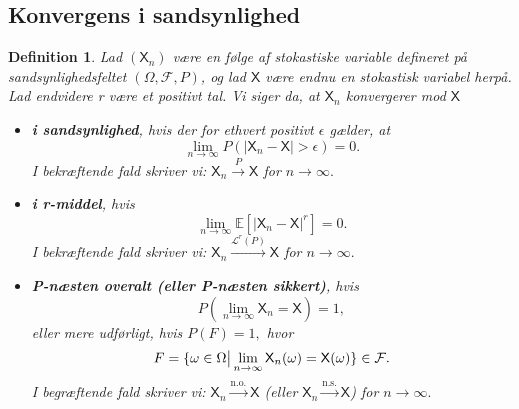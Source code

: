 \documentclass{article}
\newcommand{\E}{\mathbb{E}}
\newcommand{\1}{\mathbbm{1}}
\newcommand{\X}{\mathsf{X}}
\newcommand{\lclass}{\mathcal{L}}
\newcommand{\pfield}{(\Omega, \mathcal{F}, P)}
\newtheorem{definition}[theorem]{Definition}
\theoremstyle{boxed}
\begin{document}
\subsection{Konvergens i sandsynlighed}
\begin{theorem-box}
    \begin{definition}
        Lad $(\X_n)$ være en følge af stokastiske variable defineret på sandsynlighedsfeltet $\pfield$, og lad $\X$ være endnu en stokastisk variabel herpå. Lad endvidere r være et positivt tal. Vi siger da, at $\X_n$ konvergerer mod $\X$
        \begin{itemize}
            \item \textbf{i sandsynlighed}, hvis der for ethvert positivt $\epsilon$ gælder, at $$\lim_{n\rightarrow\infty}P(|\X_n-\X|>\epsilon)=0.$$ I bekræftende fald skriver vi: $\X_n\stackrel{P}{\longrightarrow}\X$ for $n\rightarrow \infty.$
            \item \textbf{i r-middel}, hvis $$\lim_{n\rightarrow\infty}\E\left[|\X_n-\X|^r\right]=0.$$ I bekræftende fald skriver vi: $\X_n\stackrel{\lclass^r(P)}{\longrightarrow}\X$ for $n\rightarrow \infty.$
            \item \textbf{P-næsten overalt (eller P-næsten sikkert)}, hvis $$P(\lim_{n\rightarrow\infty}\X_n=\X)=1,$$ eller mere udførligt, hvis $P(F)=1,$ hvor $$F=\{\omega\in\Omega\big{|}\lim_{n\rightarrow\infty}\X_n(\omega)=\X(\omega)\}\in \mathcal{F}.$$ I begræftende fald skriver vi: $\X_n\stackrel{\text{n.o.}}{\longrightarrow}\X$ (eller $\X_n\stackrel{\text{n.s.}}{\longrightarrow}\X$) for $n\rightarrow\infty.$
        \end{itemize}
    \end{definition}
\end{theorem-box}
\end{document}
